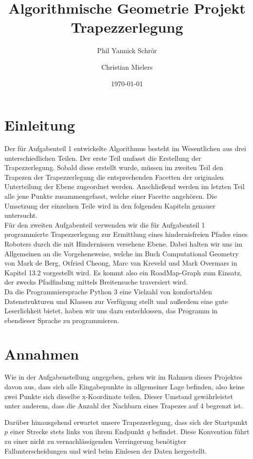 \documentclass[11pt, a4paper]{article}
\title{Algorithmische Geometrie Projekt \\ Trapezzerlegung}
\author{Phil Yannick Schrör \and Christian Mielers}
\date{\today}
\newcommand{\gerquote}[1]{\glqq#1\grqq}
\begin{document}
\maketitle

\section{Einleitung}


Der für Aufgabenteil 1 entwickelte Algorithmus besteht im Wesentlichen aus drei unterschiedlichen Teilen. Der erste Teil umfasst die Erstellung der Trapezzerlegung. Sobald diese erstellt wurde, müssen im zweiten Teil den Trapezen der Trapezzerlegung die entsprechenden Facetten der originalen Unterteilung der Ebene zugeordnet werden. Anschließend werden im letzten Teil alle jene Punkte zusammengefasst, welche einer Facette angehören. Die Umsetzung der einzelnen Teile wird in den folgenden Kapiteln genauer untersucht.\\
Für den zweiten Aufgabenteil verwenden wir die für Aufgabenteil 1 programmierte Trapezzerlegung zur Ermittlung eines hindernisfreien Pfades eines Roboters durch die mit Hindernissen versehene Ebene. Dabei halten wir uns im Allgemeinen an die Vorgehensweise, welche im Buch \gerquote{Computational Geometry} von Mark de Berg, Otfried Cheong, Marc van Kreveld und Mark Overmars in Kapitel 13.2 vorgestellt wird. Es kommt also ein RoadMap-Graph zum Einsatz, der zwecks Pfadfindung mittels Breitensuche traversiert wird.\\
Da die Programmiersprache Python 3 eine Vielzahl von komfortablen Datenstrukturen und Klassen zur Verfügung stellt und außerdem eine gute Leserlichkeit bietet, haben wir uns dazu entschlossen, das Programm in ebendieser Sprache zu programmieren.

\section{Annahmen}

Wie in der Aufgabenstellung angegeben, gehen wir im Rahmen dieses Projektes davon aus, dass sich alle Eingabepunkte in allgemeiner Lage befinden, also keine zwei Punkte sich dieselbe x-Koordinate teilen. Dieser Umstand gewährleistet unter anderem, dass die Anzahl der Nachbarn eines Trapezes auf 4 begrenzt ist.

Darüber hinausgehend erwartet unsere Trapezzerlegung, dass sich der Startpunkt $p$ einer Strecke stets links von ihrem Endpunkt $q$ befindet. Diese Konvention führt zu einer nicht zu vernachlässigenden Verringerung benötigter Fallunterscheidungen und wird beim Einlesen der Daten hergestellt.
\end{document}
